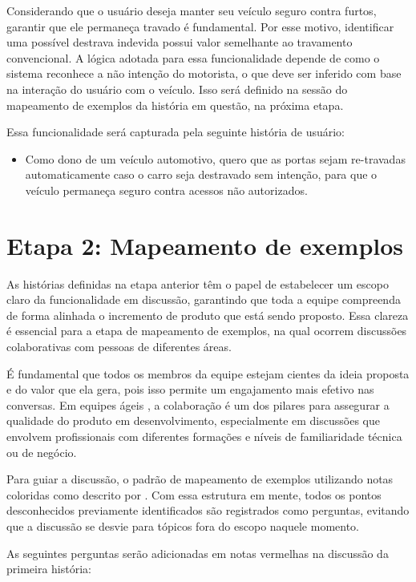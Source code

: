 Considerando que o usuário deseja manter seu veículo seguro contra furtos, garantir que ele permaneça travado é fundamental. Por esse motivo, identificar uma possível 
destrava indevida possui valor semelhante ao travamento convencional. A lógica adotada para essa funcionalidade depende de como o sistema reconhece a não intenção 
do motorista, o que deve ser inferido com base na interação do usuário com o veículo. Isso será definido na sessão do mapeamento de exemplos da história em questão, 
na próxima etapa.

Essa funcionalidade será capturada pela seguinte história de usuário:

\begin{itemize}
    \item Como dono de um veículo automotivo, quero que as portas sejam re-travadas automaticamente caso o carro seja destravado sem intenção, para que o veículo permaneça seguro contra acessos não autorizados.
\end{itemize}

\section{\textbf{Etapa 2: Mapeamento de exemplos}}
\label{sbs:etapa2}
As histórias definidas na etapa anterior têm o papel de estabelecer um escopo claro da funcionalidade em discussão, garantindo que toda a equipe compreenda de forma 
alinhada o incremento de produto que está sendo proposto. Essa clareza é essencial para a etapa de mapeamento de exemplos, na qual ocorrem discussões colaborativas 
com pessoas de diferentes áreas.

É fundamental que todos os membros da equipe estejam cientes da ideia proposta e do valor que ela gera, pois isso permite um engajamento mais efetivo nas conversas. 
Em equipes ágeis \cite{atlassianAgileTeams}, a colaboração é um dos pilares para assegurar a qualidade do produto em desenvolvimento, especialmente em discussões que 
envolvem profissionais com diferentes formações e níveis de familiaridade técnica ou de negócio.

Para guiar a discussão, o padrão de mapeamento de exemplos utilizando notas coloridas como descrito por . Com essa estrutura em mente, 
todos os pontos desconhecidos previamente identificados são registrados como perguntas, evitando que a discussão se desvie para tópicos fora do escopo naquele momento. 

As seguintes perguntas serão adicionadas em notas vermelhas na discussão da primeira história:

